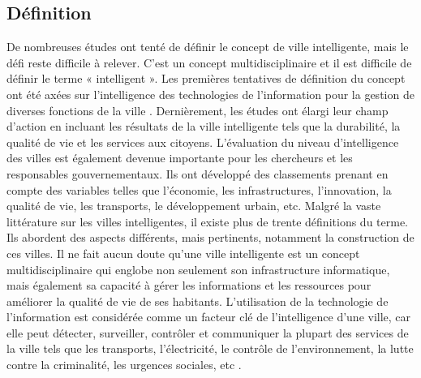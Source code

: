 \documentclass[french, a4paper, 12pt]{report}
\begin{document}
\subsection{Définition}
De nombreuses études ont tenté de définir le concept de ville intelligente, mais le défi reste difficile à relever. C’est un concept multidisciplinaire et il est difficile de définir le terme « intelligent ». Les premières tentatives de définition du concept ont été axées sur l'intelligence des technologies de l'information pour la gestion de diverses fonctions de la ville \cite{3}. 
Dernièrement, les études ont élargi leur champ d'action en incluant les résultats de la ville intelligente tels que la durabilité, la qualité de vie et les services aux citoyens.
L'évaluation du niveau d'intelligence des villes est également devenue importante pour les chercheurs et les responsables gouvernementaux. Ils ont développé des classements prenant en compte des variables telles que l'économie, les infrastructures, l'innovation, la qualité de vie, les transports, le développement urbain, etc.
Malgré la vaste littérature sur les villes intelligentes, il existe plus de trente définitions du terme. Ils abordent des aspects différents, mais pertinents, notamment la construction de ces villes. 
Il ne fait aucun doute qu'une ville intelligente est un concept multidisciplinaire qui englobe non seulement son infrastructure informatique, mais également sa capacité à gérer les informations et les ressources pour améliorer la qualité de vie de ses habitants. L'utilisation de la technologie de l'information est considérée comme un facteur clé de l'intelligence d'une ville, car elle peut détecter, surveiller, contrôler et communiquer la plupart des services de la ville tels que les transports, l'électricité, le contrôle de l'environnement, la lutte contre la criminalité, les urgences sociales, etc \cite{4}.
\end{document}
